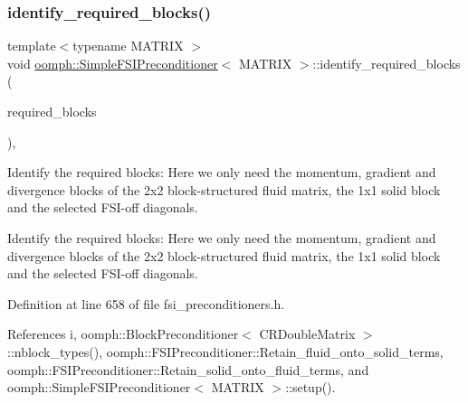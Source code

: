 \subsubsection{\texorpdfstring{identify\+\_\+required\+\_\+blocks()}{identify\_required\_blocks()}}
{\footnotesize\ttfamily template$<$typename M\+A\+T\+R\+IX $>$ \\
void \hyperlink{classoomph_1_1SimpleFSIPreconditioner}{oomph\+::\+Simple\+F\+S\+I\+Preconditioner}$<$ M\+A\+T\+R\+IX $>$\+::identify\+\_\+required\+\_\+blocks (\begin{DoxyParamCaption}\item[{\hyperlink{classoomph_1_1DenseMatrix}{Dense\+Matrix}$<$ bool $>$ \&}]{required\+\_\+blocks }\end{DoxyParamCaption})\hspace{0.3cm}{\ttfamily [private]}, {\ttfamily [virtual]}}



Identify the required blocks\+: Here we only need the momentum, gradient and divergence blocks of the 2x2 block-\/structured fluid matrix, the 1x1 solid block and the selected F\+S\+I-\/off diagonals. 

Identify the required blocks\+: Here we only need the momentum, gradient and divergence blocks of the 2x2 block-\/structured fluid matrix, the 1x1 solid block and the selected F\+S\+I-\/off diagonals. 

Definition at line 658 of file fsi\+\_\+preconditioners.\+h.



References i, oomph\+::\+Block\+Preconditioner$<$ C\+R\+Double\+Matrix $>$\+::nblock\+\_\+types(), oomph\+::\+F\+S\+I\+Preconditioner\+::\+Retain\+\_\+fluid\+\_\+onto\+\_\+solid\+\_\+terms, oomph\+::\+F\+S\+I\+Preconditioner\+::\+Retain\+\_\+solid\+\_\+onto\+\_\+fluid\+\_\+terms, and oomph\+::\+Simple\+F\+S\+I\+Preconditioner$<$ M\+A\+T\+R\+I\+X $>$\+::setup().

\mbox{\label{classoomph_1_1SimpleFSIPreconditioner_a31684c26aa10a782189c32304d9d0824}} 
